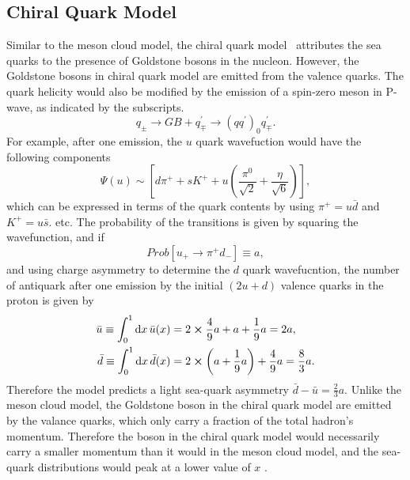 \documentclass[../main.tex]{subfiles}
\begin{document}
\subsection{Chiral Quark Model}
Similar to the meson cloud model, the chiral quark model~\cite{li1998} attributes the sea quarks to
the presence of Goldstone bosons in the nucleon. However, the Goldstone bosons in chiral quark model
are emitted from the valence quarks. The quark helicity would also be modified by the emission of a
spin-zero meson in P-wave, as indicated by the subscripts.
\begin{equation}
	q_{\pm} \rightarrow GB + q^\prime_\mp \rightarrow \left(q q^\prime\right)_0 q_{\mp}^\prime.
\end{equation}
For example, after one emission, the $u$ quark wavefuction would have the following components
\begin{equation}
	\Psi\left(u\right) \sim \left[d\pi^+ + s K^+ + u \left(\frac{\pi^0}{\sqrt{2}} + \frac{\eta}{\sqrt{6}}\right)\right],
\end{equation}
which can be expressed in terms of the quark contents by using $\pi^+ = u\bar{d}$ and $K^+ = u\bar{s}$. etc.
The probability of the transitions is given by squaring the wavefunction, and if
\begin{equation}
	Prob\left[ u_+ \rightarrow \pi^+d_-\right] \equiv a,
\end{equation}
and using charge asymmetry to determine the $d$ quark wavefucntion, the number of antiquark after one emission
by the initial $(2u+d)$ valence quarks in the proton is given by
\begin{equation}
	\begin{aligned}
		\bar{u} \equiv \int^1_0 \dd{x}\bar{u}(x) & = 2\cross\frac{4}{9}a +a+\frac{1}{9}a = 2a,                         \\
		\bar{d} \equiv \int^1_0 \dd{x}\bar{d}(x) & = 2\cross\left(a+\frac{1}{9}a\right) + \frac{4}{9}a = \frac{8}{3}a.
	\end{aligned}
\end{equation}
Therefore the model predicts a light sea-quark asymmetry $\bar{d}-\bar{u} =\frac{2}{3}a $.
Unlike the meson cloud model, the Goldstone boson in the chiral quark model are emitted
by the valance quarks, which only carry a fraction of the total hadron's momentum.
Therefore the boson in the chiral quark model would necessarily carry a smaller momentum than
it would in the meson cloud model, and the sea-quark distributions would peak at a lower value of $x$ \cite{szczurek1996,peng1998}.
\end{document}
